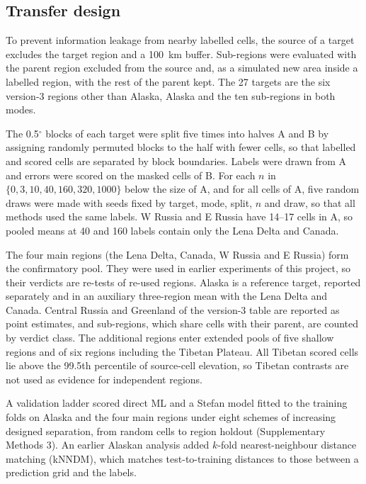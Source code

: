 \subsection{Transfer design}\label{sec:m-transfer}

To prevent information leakage from nearby labelled cells, the source of a target excludes the target region and a 100~km buffer. Sub-regions were evaluated with the parent region excluded from the source and, as a simulated new area inside a labelled region, with the rest of the parent kept. The 27 targets are the six version-3 regions other than Alaska, Alaska and the ten sub-regions in both modes.

The 0.5$^{\circ}$ blocks of each target were split five times into halves A and B by assigning randomly permuted blocks to the half with fewer cells, so that labelled and scored cells are separated by block boundaries\cite{Roberts2017}. Labels were drawn from A and errors were scored on the masked cells of B. For each $n$ in $\{0, 3, 10, 40, 160, 320, 1000\}$ below the size of A, and for all cells of A, five random draws were made with seeds fixed by target, mode, split, $n$ and draw, so that all methods used the same labels. W Russia and E Russia have 14--17 cells in A, so pooled means at 40 and 160 labels contain only the Lena Delta and Canada.

The four main regions (the Lena Delta, Canada, W Russia and E Russia) form the confirmatory pool. They were used in earlier experiments of this project, so their verdicts are re-tests of re-used regions. Alaska is a reference target, reported separately and in an auxiliary three-region mean with the Lena Delta and Canada. Central Russia and Greenland of the version-3 table are reported as point estimates, and sub-regions, which share cells with their parent, are counted by verdict class. The additional regions enter extended pools of five shallow regions and of six regions including the Tibetan Plateau. All Tibetan scored cells lie above the 99.5th percentile of source-cell elevation, so Tibetan contrasts are not used as evidence for independent regions.

A validation ladder scored direct ML and a Stefan model fitted to the training folds on Alaska and the four main regions under eight schemes of increasing designed separation, from random cells to region holdout (Supplementary Methods 3). An earlier Alaskan analysis added $k$-fold nearest-neighbour distance matching (kNNDM)\cite{Linnenbrink2024}, which matches test-to-training distances to those between a prediction grid and the labels.

